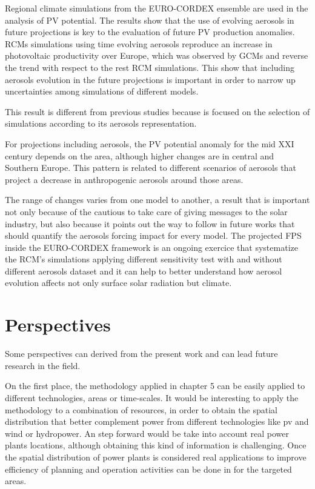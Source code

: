   Regional climate simulations from the EURO-CORDEX ensemble are used in the analysis of PV potential. The results show that the use of evolving aerosols in future projections is key to the evaluation of future PV production anomalies. RCMs simulations using time evolving aerosols reproduce an increase in photovoltaic productivity over Europe, which was observed by GCMs and reverse the trend with respect to the rest RCM simulations. This show that including aerosols evolution in the future projections is important in order to narrow up uncertainties among simulations of different models. 

  This result is different from previous studies because is focused on the selection of simulations according to its aerosols representation.
  
  For projections including aerosols, the PV potential anomaly for the mid XXI century depends on the area, although higher changes are in central and Southern Europe. This pattern is related to different scenarios of aerosols that project a decrease in anthropogenic aerosols around those areas.

  The range of changes varies from one model to another, a result that is important not only because of the cautious to take care of giving messages to the solar industry, but also because it points out the way to follow in future works that should quantify the aerosols forcing impact for every model. The projected FPS inside the EURO-CORDEX framework is an ongoing exercice that systematize the RCM's simulations applying different sensitivity test with and without different aerosols dataset and it can help to better understand how aerosol evolution affects not only surface solar radiation but climate.

\chapter{Perspectives\label{perspectives}}

Some perspectives can derived from the present work and can lead future research in the field.

On the first place, the methodology applied in chapter 5 can be easily applied to different technologies, areas or time-scales. It would be interesting to apply the methodology to a combination of resources, in order to obtain the spatial distribution that better complement power from different technologies like pv and wind or hydropower. An step forward would be take into account real power plants locations, although obtaining this kind of information is challenging. Once the spatial distribution of power plants is considered real applications to improve efficiency of planning and operation activities can be done in for the targeted areas.

